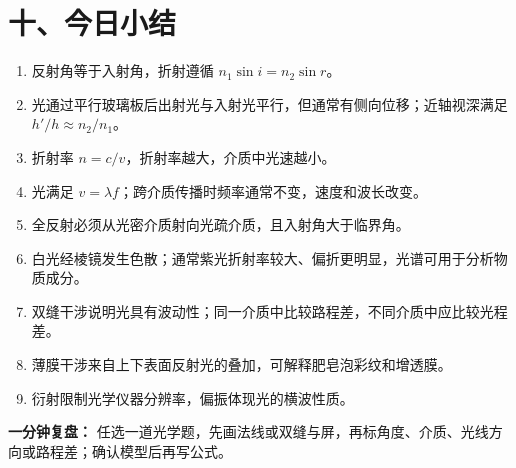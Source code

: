 \section*{十、今日小结}
\begin{enumerate}
  \item 反射角等于入射角，折射遵循 $n_1\sin i=n_2\sin r$。
  \item 光通过平行玻璃板后出射光与入射光平行，但通常有侧向位移；近轴视深满足 $h'/h\approx n_2/n_1$。
  \item 折射率 $n=c/v$，折射率越大，介质中光速越小。
  \item 光满足 $v=\lambda f$；跨介质传播时频率通常不变，速度和波长改变。
  \item 全反射必须从光密介质射向光疏介质，且入射角大于临界角。
  \item 白光经棱镜发生色散；通常紫光折射率较大、偏折更明显，光谱可用于分析物质成分。
  \item 双缝干涉说明光具有波动性；同一介质中比较路程差，不同介质中应比较光程差。
  \item 薄膜干涉来自上下表面反射光的叠加，可解释肥皂泡彩纹和增透膜。
  \item 衍射限制光学仪器分辨率，偏振体现光的横波性质。
\end{enumerate}

\textbf{一分钟复盘：} 任选一道光学题，先画法线或双缝与屏，再标角度、介质、光线方向或路程差；确认模型后再写公式。
